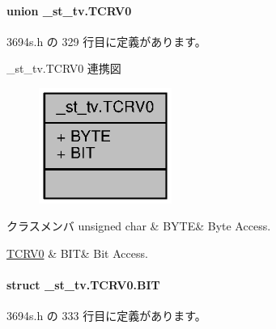\paragraph{union \+\_\+st\+\_\+tv.\+T\+C\+R\+V0}


 3694s.\+h の 329 行目に定義があります。



\+\_\+st\+\_\+tv.\+T\+C\+R\+V0 連携図
\nopagebreak
\begin{figure}[H]
\begin{center}
\leavevmode
\includegraphics[width=123pt]{d1/d36/union__st__tv_8TCRV0__coll__graph}
\end{center}
\end{figure}
\begin{DoxyFields}{クラスメンバ}
unsigned char\label{3694s_8h_ae409eb2ba6eb6801f52763ae370c350e}
&
B\+Y\+T\+E&
Byte Access. \\
\hline

\hyperlink{3694s_8h_d8/d7a/struct__st__tv_8TCRV0_8BIT}{T\+C\+R\+V0}\label{3694s_8h_adb957fdc8000e1eef04a243f5199aa52}
&
B\+I\+T&
Bit Access. \\
\hline

\end{DoxyFields}
\label{struct__st__tv_8TCRV0_8BIT}
\paragraph{struct \+\_\+st\+\_\+tv.\+T\+C\+R\+V0.\+B\+I\+T}


 3694s.\+h の 333 行目に定義があります。



